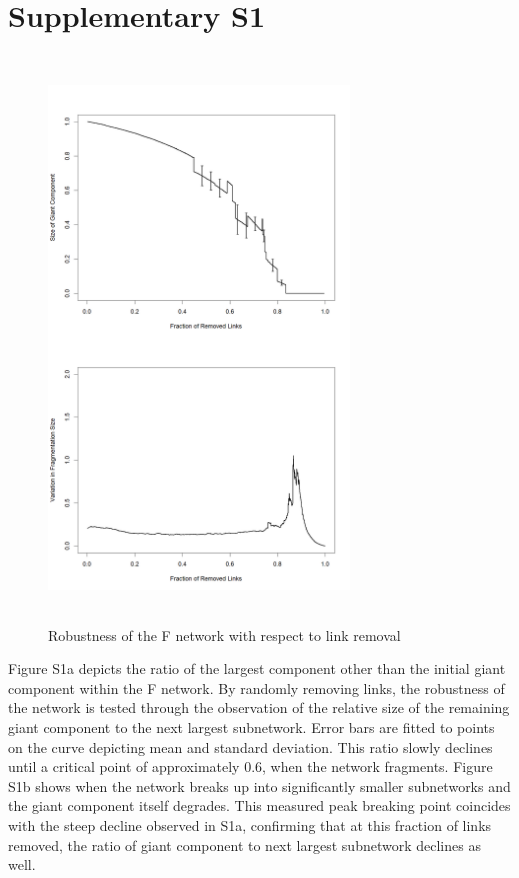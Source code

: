 \documentclass[10pt]{article}         %
\begin{document}
\newpage
\section{Supplementary S1}
\begin{figure}[!htb]
  \centering
  \includegraphics[width=8cm, height=15cm]{FigS1.png}
  \caption{Robustness of the F network with respect to link removal}
  \label{fig:S2ab}
\end{figure}
Figure S1a depicts the ratio of the largest component other than the initial giant component within the F network. By randomly removing links, the robustness of the network is tested through the observation of the relative size of the remaining giant component to the next largest subnetwork. Error bars are fitted to points on the curve depicting mean and standard deviation. This ratio slowly declines until a critical point of approximately 0.6, when the network fragments. Figure S1b shows when the network breaks up into significantly smaller subnetworks and the giant component itself degrades. This measured peak breaking point coincides with the steep decline observed in S1a, confirming that at this fraction of links removed, the ratio of giant component to next largest subnetwork declines as well. 
\end{document}
